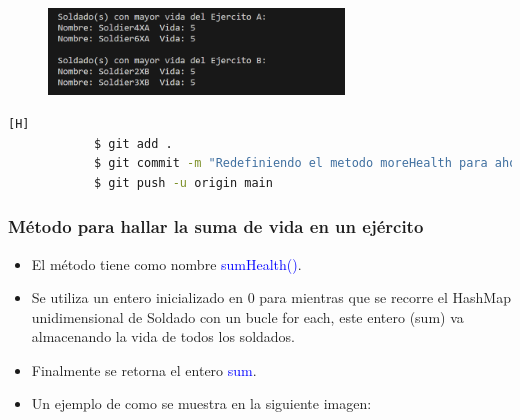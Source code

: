 \documentclass{article}
\begin{document}
        \begin{figure}[H]
            \centering
            \includegraphics[width=0.7\textwidth,keepaspectratio]{img/moreHealth.png}
            \caption{}
        \end{figure}

        \begin{lstlisting}[language=bash,caption={Commit \href{https://github.com/hernanchoquehuanca/fp2-23b/commit/9c29bbd8bd39e301bed91579d079d5545a899d0e}{9c29bbd}: Se agregó el método moreHealt() que imprimirá aquellos soldados que tengan la mayor vida dentro de su ejército}][H]
    		$ git add .
    		$ git commit -m "Redefiniendo el metodo moreHealth para ahora trabajar con HashMap, se cambio el metodo para acceder a los valores del HashMap en el for each"
    		$ git push -u origin main
    	\end{lstlisting}
        
        
        \subsubsection{Método para hallar la suma de vida en un ejército}

        \begin{itemize}
            \item El método tiene como nombre \textcolor{blue}{sumHealth()}.
            \item Se utiliza un entero inicializado en 0 para mientras que se recorre el HashMap unidimensional de Soldado con un bucle for each, este entero (sum) va almacenando la vida de todos los soldados.
            \item Finalmente se retorna el entero \textcolor{blue}{sum}.
        \end{itemize}

        
        \newpage
        \begin{itemize}
            \begin{itemize}
                \item Un ejemplo de como se muestra en la siguiente imagen:
            \end{itemize}
        \end{itemize}
\end{document}

